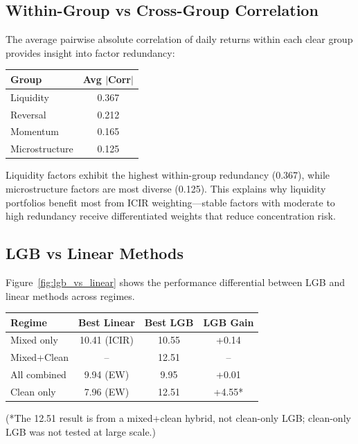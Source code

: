 \documentclass[11pt,a4paper]{ctexart}
\begin{document}
\subsection{Within-Group vs Cross-Group Correlation}

The average pairwise absolute correlation of daily returns within each clear group provides insight into factor redundancy:

\begin{center}
\begin{tabular}{lc}
\toprule
\textbf{Group} & \textbf{Avg $|$Corr$|$} \\
\midrule
Liquidity       & 0.367 \\
Reversal        & 0.212 \\
Momentum        & 0.165 \\
Microstructure  & 0.125 \\
\bottomrule
\end{tabular}
\end{center}

Liquidity factors exhibit the highest within-group redundancy (0.367), while microstructure factors are most diverse (0.125). This explains why liquidity portfolios benefit most from ICIR weighting---stable factors with moderate to high redundancy receive differentiated weights that reduce concentration risk.

\subsection{LGB vs Linear Methods}

Figure~\ref{fig:lgb_vs_linear} shows the performance differential between LGB and linear methods across regimes.

\begin{center}
\begin{tabular}{lccc}
\toprule
\textbf{Regime} & \textbf{Best Linear} & \textbf{Best LGB} & \textbf{LGB Gain} \\
\midrule
Mixed only    & 10.41 (ICIR) & 10.55 & +0.14  \\
Mixed+Clean   & --           & 12.51 & --     \\
All combined  & 9.94  (EW)   & 9.95  & +0.01  \\
Clean only    & 7.96  (EW)   & 12.51 & +4.55* \\
\bottomrule
\end{tabular}
\end{center}
(*The 12.51 result is from a mixed+clean hybrid, not clean-only LGB; clean-only LGB was not tested at large scale.)
\end{document}
